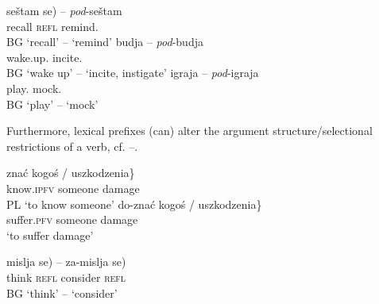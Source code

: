 \documentclass[output=paper,colorlinks,citecolor=brown]{langscibook}
\begin{document}
\ea\label{basics:lexical:idiosyncratic-prefixes:BG}
\ea \gll seštam \minsp{*(} se) -- \textit{pod}-seštam\\
recall {} \textsc{refl} {} remind.{\PFV}\\ \hfill BG
\glt `recall' -- `remind' 
%
\ex \gll budja -- \textit{pod}-budja\\
wake.up.{\IPFV} {} incite.{\PFV}\\ \hfill BG
\glt `wake up' -- `incite, instigate'
%
\ex \gll igraja -- \textit{pod}-igraja\\
play.{\IPFV} {} mock.{\PFV}\\ \hfill BG
\glt `play' -- `mock' \\ 
%
\z
\z

\noindent Furthermore, lexical prefixes (can) alter the argument structure/selectional restrictions of a verb, cf. --.
    

\ea\label{basics:argument-structurePL}
\ea \gll znać \minsp{\{} kogo\'{s} / \minsp{*} uszkodzenia\} \\ 
know.\textsc{ipfv} {} someone {} {} damage \\ \hfill PL
\glt `to know someone'
\ex \gll do-znać \minsp{\{*} kogo\'{s} / uszkodzenia\}\\
suffer.\textsc{pfv} {} someone {} damage\\ 
\glt `to suffer damage'  
\z 
\z 

\ea\label{basics:argument-structureBG} 
\gll mislja \minsp{(*} se) -- za-mislja \minsp{*(} se) \\
think {} \textsc{refl} {} consider {}  \textsc{refl} \\ \hfill BG
\glt `think'  -- `consider'
%
\z 

\iffalse
\ea\label{basics:argument-structure}
\ea \gll znać \minsp{\{} kogo\'{s} / *uszkodzeni\}a -- \textit{do}-znać \minsp{\{*} kogo\'{s} / uszkodzenia\} \\
know.\textsc{ipfv} {} someone {} damage {} suffer.\textsc{pfv} someone {} damage\\ \hfill [PL]
\glt `to know someone' -- `to suffer damage'  
%
\ex \gll mislja \minsp{(*} se) -- \textit{za}-mislja \minsp{*(} se) \\
think {} \textsc{refl} {} consider {}  \textsc{refl} \\ \hfill [BG]
\glt `think'  -- `consider'
%
\z 
\z 
\fi
\end{document}
